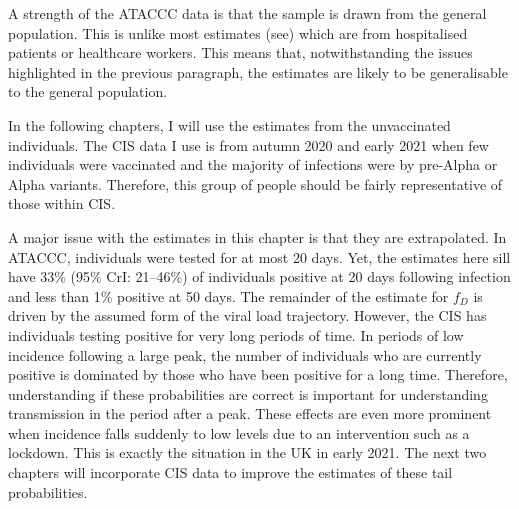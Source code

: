 \documentclass[thesis.tex]{subfiles}
\begin{document}
A strength of the ATACCC data is that the sample is drawn from the general population.
This is unlike most estimates (see) which are from hospitalised patients or healthcare workers.
This means that, notwithstanding the issues highlighted in the previous paragraph, the estimates are likely to be generalisable to the general population.

In the following chapters, I will use the estimates from the unvaccinated individuals.
The CIS data I use is from autumn 2020 and early 2021 when few individuals were vaccinated and the majority of infections were by pre-Alpha or Alpha variants.
Therefore, this group of people should be fairly representative of those within CIS.

A major issue with the estimates in this chapter is that they are extrapolated.
In ATACCC, individuals were tested for at most 20 days.
Yet, the estimates here sill have 33\% (95\% CrI: 21--46\%) of individuals positive at 20 days following infection and less than 1\% positive at 50 days.
The remainder of the estimate for $f_D$ is driven by the assumed form of the viral load trajectory.
However, the CIS has individuals testing positive for very long periods of time.
In periods of low incidence following a large peak, the number of individuals who are currently positive is dominated by those who have been positive for a long time.
Therefore, understanding if these probabilities are correct is important for understanding transmission in the period after a peak.
These effects are even more prominent when incidence falls suddenly to low levels due to an intervention such as a lockdown.
This is exactly the situation in the UK in early 2021.
The next two chapters will incorporate CIS data to improve the estimates of these tail probabilities.

\ifSubfilesClassLoaded{
  \appendix
  
  
  \listoftodos
}{}
\end{document}

